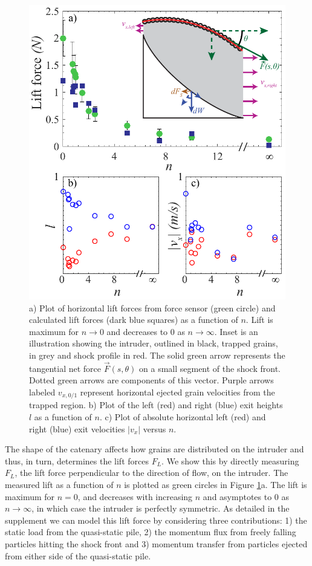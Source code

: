 \begin{figure}
	\includegraphics[width=\textwidth]{Figures/chapter3/forcePlot}
	\caption{a) Plot of horizontal lift forces from force sensor (green circle) and calculated lift forces (dark blue squares) as a function of $n$. Lift is maximum for $n\rightarrow 0$ and decreases to $0$ as $n\rightarrow\infty$. Inset is an illustration showing the intruder, outlined in black, trapped grains, in grey and shock profile in red. The solid green arrow represents the tangential net force $\vec{F}(s,\theta)$ on a small segment of the shock front. Dotted green arrows are components of this vector. Purple arrows labeled $v_{x,0/1}$ represent horizontal ejected grain velocities from the trapped region. b) Plot of the left (red) and right (blue) exit heights $l$ as a function of $n$. c) Plot of absolute horizontal left (red) and right (blue) exit velocities $|v_{x}|$ versus $n$.}
	\label{forcePlot}
\end{figure}

The shape of the catenary affects how grains are distributed on the intruder and thus, in turn, determines the lift forces $F_{L}$.   We show this by directly measuring $F_L$, the lift force perpendicular to the direction of flow, on the intruder. The measured lift as a function of $n$ is plotted as green circles in Figure \ref{forcePlot}a.  The lift is maximum for $n=0$, and decreases with increasing $n$ and asymptotes to $0$ as $n\rightarrow\infty$, in which case the intruder is perfectly symmetric.  As detailed in the supplement we can model this lift force by considering three contributions: 1) the static load from the quasi-static pile, 2) the momentum flux from freely falling particles hitting the shock front and 3) momentum transfer from particles ejected from either side of the quasi-static pile. 

